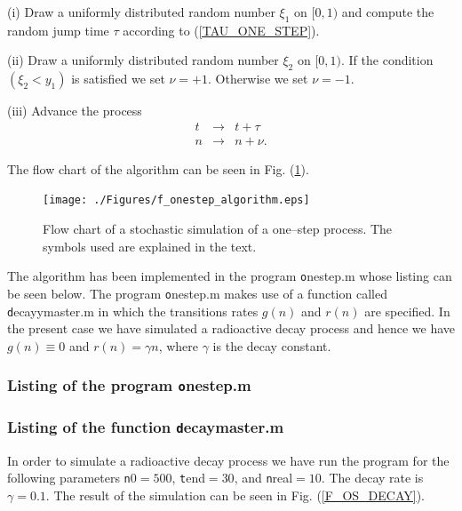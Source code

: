 (i) Draw a uniformly distributed random number $\xi_1$ on $[0,1)$
   and compute the random jump time $\tau$ according to 
   (\ref{TAU_ONE_STEP}). 
   
(ii) Draw a uniformly distributed random number $\xi_2$ on 
$[0,1)$. If the condition $(\xi_2 < y_1)$ is satisfied we set 
$\nu =+1$.  Otherwise we set $\nu =-1$.

(iii) Advance the process
\begin{eqnarray*}
t &\longrightarrow& t+\tau \\
n & \longrightarrow & n + \nu.
\end{eqnarray*}

The flow chart of the algorithm can be seen in Fig. 
(\ref{F_ONESTEP_ALGORITHM}).
\begin{figure}
\label{F_ONESTEP_ALGORITHM}
\texttt{[image: ./Figures/f\_onestep\_algorithm.eps]}
\caption{Flow chart of a stochastic simulation of a 
    one--step process. The symbols used
     are explained in the text.}
\end{figure}
The algorithm has been implemented in the program {\texttt onestep.m}
whose listing can be seen below. The program {\texttt onestep.m} makes
use of a function called {\texttt decayymaster.m} in which the
transitions rates $g(n)$ and $r(n)$ are specified. In the present case
we have simulated a radioactive decay process and hence we have
$g(n) \equiv 0$ and $r(n)= \gamma n$, where $\gamma$ is the decay constant.

\subsubsection{Listing of the program {\texttt onestep.m}}

\subsubsection{Listing of the function {\texttt decaymaster.m}}

In order to simulate a radioactive decay process 
we have run the program for the following parameters
{\texttt n0}$=500$, {\texttt tend}$=30$, and {\texttt nreal}$=10$.
The decay rate is $\gamma=0.1$.
The result of the simulation can be seen in Fig. (\ref{F_OS_DECAY}).

